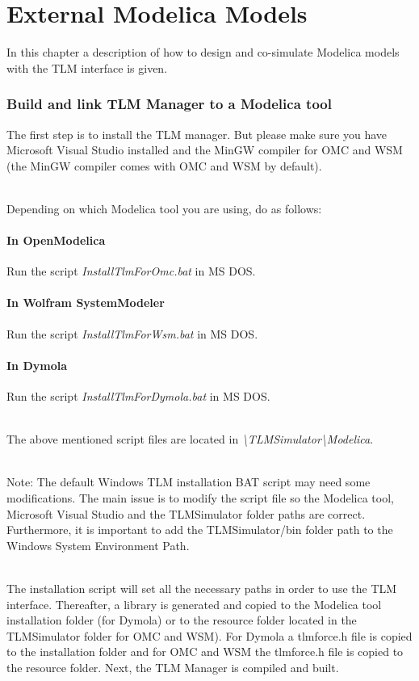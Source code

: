 \chapter{External Modelica Models}
\label{MMModelica}

In this chapter a description of how to design and co-simulate Modelica models with the TLM interface is given.

\subsection{Build and link TLM Manager to a Modelica tool}

The first step is to install the TLM manager. 
But please make sure you have Microsoft Visual Studio installed and the MinGW compiler for OMC and WSM (the MinGW compiler comes with OMC and WSM by default).

~\\Depending on which Modelica tool you are using, do as follows:

\subsubsection{In OpenModelica}
Run the script \textit{InstallTlmForOmc.bat} in MS DOS.

\subsubsection{In Wolfram SystemModeler}
Run the script \textit{InstallTlmForWsm.bat} in MS DOS.

\subsubsection{In Dymola}
Run the script \textit{InstallTlmForDymola.bat} in MS DOS.

~\\The above mentioned script files are located in \textit{\textbackslash TLMSimulator\textbackslash Modelica}.

~\\Note: The default Windows TLM installation BAT script may need some modifications.
The main issue is to modify the script file so the Modelica tool, Microsoft Visual Studio and the TLMSimulator folder paths are correct. 
Furthermore, it is important to add the TLMSimulator/bin folder path to the Windows System Environment Path. 
 

~\\ The installation script will set all the necessary paths in order to use the TLM interface. 
Thereafter, a library is generated and copied to the Modelica tool installation folder (for Dymola) or to the resource folder located in the TLMSimulator folder for OMC and WSM). 
For Dymola a tlmforce.h file is copied to the installation folder and for OMC and WSM the tlmforce.h file is copied to the resource folder. 
Next, the TLM Manager is compiled and built.

